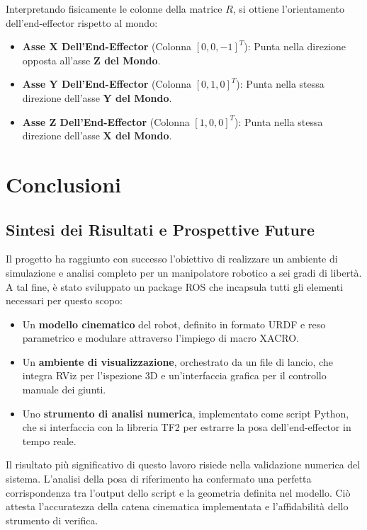 \documentclass[11pt, a4paper]{report}
\begin{document}
Interpretando fisicamente le colonne della matrice \(R\), si ottiene l'orientamento dell'end-effector rispetto al mondo:
\begin{itemize}
    \item \textbf{Asse X Dell'End-Effector} (Colonna \([0, 0, -1]^T\)): Punta nella direzione opposta all'asse \textbf{Z del Mondo}.
    \item \textbf{Asse Y Dell'End-Effector} (Colonna \([0, 1, 0]^T\)): Punta nella stessa direzione dell'asse \textbf{Y del Mondo}.
    \item \textbf{Asse Z Dell'End-Effector} (Colonna \([1, 0, 0]^T\)): Punta nella stessa direzione dell'asse \textbf{X del Mondo}.
\end{itemize}

\chapter{Conclusioni}
\label{chap:conclusioni}

\section{Sintesi dei Risultati e Prospettive Future}
\label{sec:sintesi_e_prospettive}

Il progetto ha raggiunto con successo l'obiettivo di realizzare un ambiente di simulazione e analisi completo per un manipolatore robotico a sei gradi di libertà. A tal fine, è stato sviluppato un package ROS che incapsula tutti gli elementi necessari per questo scopo:
\begin{itemize}
    \item Un \textbf{modello cinematico} del robot, definito in formato URDF e reso parametrico e modulare attraverso l'impiego di macro XACRO.
    \item Un \textbf{ambiente di visualizzazione}, orchestrato da un file di lancio, che integra RViz per l'ispezione 3D e un'interfaccia grafica per il controllo manuale dei giunti.
    \item Uno \textbf{strumento di analisi numerica}, implementato come script Python, che si interfaccia con la libreria TF2 per estrarre la posa dell'end-effector in tempo reale.
\end{itemize}

Il risultato più significativo di questo lavoro risiede nella validazione numerica del sistema. L'analisi della posa di riferimento ha confermato una perfetta corrispondenza tra l'output dello script e la geometria definita nel modello. Ciò attesta l'accuratezza della catena cinematica implementata e l'affidabilità dello strumento di verifica.
\end{document}
